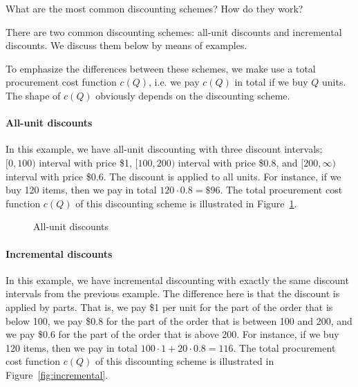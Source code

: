 \begin{exercise}
What are the most common discounting schemes? How do they work?


\begin{solution}
There are two common discounting schemes: all-unit discounts and incremental discounts. We discuss them below by means of examples. 

To emphasize the differences between these schemes, we make use a total procurement cost function $c(Q)$, i.e. we pay $c(Q)$ in total if we buy $Q$ units. The shape of $c(Q)$ obviously depends on the discounting scheme.

\paragraph{All-unit discounts} In this example, we have all-unit discounting with three discount intervals; $[0,100)$ interval with price \$1, $[100,200)$ interval with price \$0.8, and $[200,\infty)$ interval with price \$0.6. The discount is applied to all units. For instance, if we buy 120 items, then we pay in total $120\cdot 0.8=\$96$. The total procurement cost function $c(Q)$ of this discounting scheme is illustrated in Figure~\ref{fig:allunit}.

\begin{figure}[htbp]
\centering
{}
\caption{All-unit discounts}
\label{fig:allunit}
\end{figure}


\paragraph{Incremental discounts} In this example, we have incremental discounting with exactly the same discount intervals from the previous example. The difference here is that the discount is applied by parts. That is, we pay \$1 per unit for the part of the order that is below 100, we pay \$0.8 for the part of the order that is between 100 and 200, and we pay \$0.6 for the part of the order that is above 200. For instance, if we buy 120 items, then we pay in total $100\cdot 1 + 20 \cdot 0.8=116$. The total procurement cost function $c(Q)$ of this discounting scheme is illustrated in Figure~\ref{fig:incremental}.


\end{solution}
\end{exercise}
